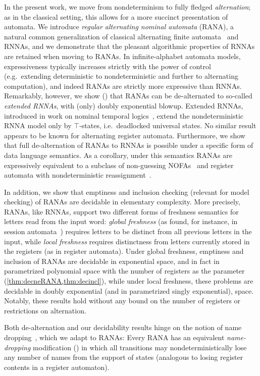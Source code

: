 \documentclass[10pt,a4paper]{amsart}
\theoremstyle{definition}
\begin{document}
In the present work, we move from nondeterminism to fully fledged \emph{alternation}; as in the
classical setting, this allows for a more succinct presentation of automata. We introduce
\emph{regular alternating nominal automata} (RANA), a natural common generalization of
classical alternating finite automata~\cite{cks81} and RNNAs, and we demonstrate that the
pleasant algorithmic properties of RNNAs are retained when moving to RANAs. In
infinite-alphabet automata models, expressiveness typically increases strictly with the power
of control (e.g.~extending deterministic to nondeterministic and further to alternating
computation), and indeed RANAs are strictly more expressive than RNNAs. Remarkably, however, we
show () that RANAs can be de-alternated to so-called \emph{extended RNNAs},
with (only) doubly exponential blowup. Extended RNNAs, introduced in work on nominal temporal
logics~\cite{hms21}, extend the nondeterministic RNNA model only by $\top$-states,
i.e.~deadlocked universal states. No similar result appears to be known for alternating
register automata. Furthermore, we show that full de-alternation of RANAs to RNNAs is possible
under a specific form of data language semantics. As a corollary, under this semantics RANAs
are expressively equivalent to a subclass of non-guessing NOFAs~\cite{BojanczykEA14} and
register automata with nondeterministic reassignment~\cite{BojanczykEA14,KaminskiZeitlin10}.

In addition, we show that emptiness and inclusion checking (relevant for
model checking) of RANAs
are decidable in elementary complexity. More precisely, RANAs, like
RNNAs, support two different forms of freshness semantics for letters
read from the input word: \emph{global freshness} (as found, for
instance, in session automata~\cite{BolligEA14}) requires letters to
be distinct from all previous letters in the input, while \emph{local
  freshness} requires distinctness from letters currently stored in
the registers (as in register automata). Under global freshness,
emptiness and inclusion of RANAs are decidable in exponential space, and in
fact in parametrized polynomial space with the number of registers as
the parameter
(\cref{thm:decneRANA,thm:decincl}),
while under local freshness, these problems are decidable in doubly
exponential (and in parametrized singly exponential),
space. Notably, these results hold without any bound on the number of
registers or restrictions on alternation.

Both de-alternation and our decidability results hinge on
the notion of name dropping~\cite{skmw17}, which we adapt to RANAs:
Every RANA has an equivalent \emph{name-dropping} modification
() in which all transitions may
nondeterministically lose any number of names from the support of states
(analogous to losing register contents in a register automaton).%
\end{document}
